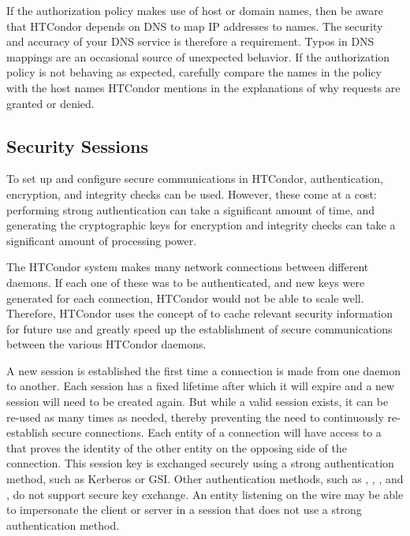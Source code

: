 If the authorization policy makes use of host or domain names, then
be aware that HTCondor depends on DNS to map IP addresses to names.  The
security and accuracy of your DNS service is therefore a requirement.
Typos in DNS mappings are an occasional source of unexpected behavior.
If the authorization policy is not behaving as expected, carefully compare
the names in the policy with the host names HTCondor mentions in the
explanations of why requests are granted or denied.

\subsection{\label{sec:Security-Sessions}Security Sessions}

To set up and configure secure communications in HTCondor,
authentication, encryption, and integrity checks can be used.  
However, these come at a cost: performing strong authentication can
take a significant amount of time, and  generating the cryptographic
keys for encryption and integrity checks can take a significant amount
of processing power. 

The HTCondor system makes many network connections between different
daemons.  
If each one of these was to be authenticated,
and new keys were generated for each connection,
HTCondor would not be able to scale well.  
Therefore, HTCondor uses the concept of  to cache
relevant security information for future use and greatly speed up the
establishment of secure communications between the various HTCondor
daemons.

A new session is established the first time a connection is made from one daemon to another.
Each session has a fixed lifetime after which it will expire and
a new session will need to be created again.
But while a valid session exists, it can be re-used as many times as
needed, thereby preventing the need to continuously re-establish secure connections.
Each entity of a connection will have access to a  that proves the
identity of the other entity on the opposing side of the connection.
This session key is exchanged securely using
a strong authentication method, such as Kerberos or GSI.
Other authentication methods, such as ,
,  , and
, do not support secure key exchange.
An entity
listening on the wire may be able to impersonate the client or server
in a session that does not use a strong authentication method.

